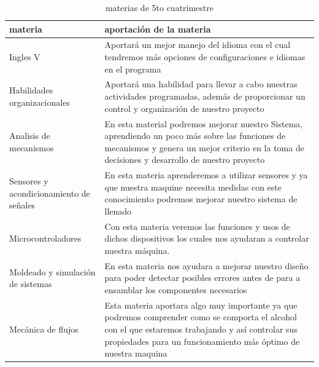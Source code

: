 \documentclass[12pt,a4paper]{article}
\begin{document}
\begin{table}[H]
\centering
\begin{tabular}{|m{4cm}|m{11cm}|}

\hline
materia & aportación de la materia \\
\hline
Ingles V &  Aportará un mejor manejo del idioma con el cual tendremos más opciones de configuraciones e idiomas en el programa \\
\hline
Habilidades organizacionales & Aportará una habilidad para llevar a cabo nuestras actividades programadas, además de proporcionar un control y organización de nuestro proyecto \\
\hline
Analisis de mecanismos & En esta material podremos mejorar nuestro Sistema, aprendiendo un poco más sobre las funciones de mecanismos y genera un mejor criterio en la toma de decisiones y desarrollo de nuestro proyecto \\
\hline
Sensores y acondicionamiento de señales & En esta materia aprenderemos a utilizar sensores y ya que nuestra maquine necesita medidas con este conocimiento podremos mejorar nuestro sistema de llenado \\
\hline
Microcontroladores & Con esta materia veremos las funciones y usos de dichos dispositivos los cuales nos ayudaran a controlar nuestra máquina.\\
\hline
Moldeado y simulación de sistemas & En esta materia nos ayudara a mejorar nuestro diseño para poder detectar posibles errores antes de para a ensamblar los componentes necesarios \\
\hline
Mecánica de flujos & Esta materia aportara algo muy importante ya que podremos comprender como se comporta el alcohol con el que estaremos trabajando y así controlar sus propiedades para un funcionamiento más óptimo de nuestra maquina \\
\hline

\end{tabular}
\caption{materias de 5to cuatrimestre}
\label{lineas}
\end{table}
\end{document}

